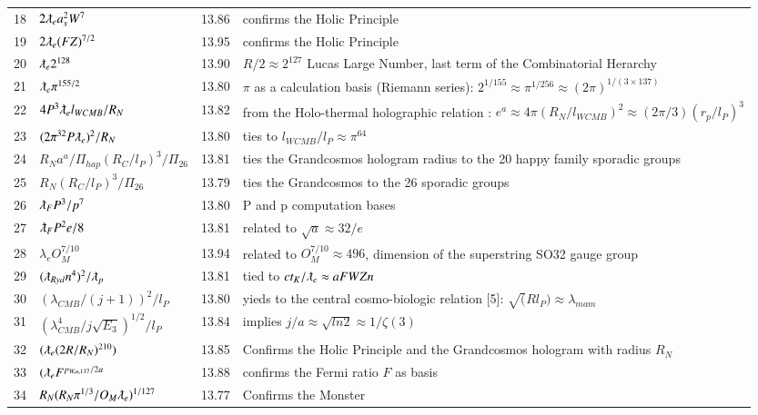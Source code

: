 \documentclass[a4paper,9pt]{article}
\begin{document}
\begin{appendix}
\begin{table}
\begin{tabular}{llll}
    18 & $2\lambdabar_{e} a_s^2 W^7$ & 13.86 & confirms the Holic Principle \\
    19 & $2\lambdabar_{e} (FZ)^{7/2}$ & 13.95 & confirms the Holic Principle \\
    20 & $\lambdabar_{e} 2^{128}$ & 13.90 & $R/2 \approx 2^{127}$ Lucas Large Number, last term of the Combinatorial Herarchy\\
    21 & $\lambdabar_{e} \pi^{155/2}$ & 13.80 & $\pi$ as a calculation basis (Riemann series): $2^{1/155} \approx \pi^{1/256} \approx (2\pi)^{1/(3\times 137)}$ \\
    22 & $4P^3\lambdabar_{e} l_{WCMB} /R_N$ & 13.82 & from the Holo-thermal holographic relation : $e^a \approx 4\pi (R_N/l_{WCMB} )^2 \approx (2\pi /3) (r_p/l_P)^3$  \\
    23 & $(2\pi^{32}P\lambdabar_{e})^2 /R_N$ & 13.80 & ties to $l_{WCMB}/l_P \approx \pi^{64}$ \\        
    24 & $R_N a^a/\Pi_{hap} (R_{C}/l_P)^3/\Pi_{26}$ & 13.81 & ties the Grandcosmos hologram radius to the 20 happy family sporadic groups \\  
    25 & $R_N (R_{C}/l_P)^3/\Pi_{26}$ & 13.79 & ties the Grandcosmos to the 26 sporadic groups \\   
    26 & $\lambdabar_{F} P^3 /p^7$ & 13.80 & P and p computation bases \\      
    27 & $\lambdabar_{F} P^2 e/8$ & 13.81 &  related to $\sqrt a  \approx 32/e$ \\     
    28 &  $\lambda_{e} O_M^{7/10}$ & 13.94 &  related to $O_M^{7/10} \approx 496$, dimension of the superstring SO32 gauge group  \\
    29 & $(\lambdabar_{Ryd} n^{4})^2/\lambdabar_p$ & 13.81 & tied to $ct_K/\lambdabar_e \approx aFWZn$ \\ 
    30 & $(\lambda_{CMB}/(j+1))^2/l_P$ & 13.80 & yieds to the central cosmo-biologic relation [5]: $\sqrt(Rl_P) \approx \lambda_{mam}$ \\
    31 & $(\lambda_{CMB}^4/j\sqrt{E_3})^{1/2}/l_P$ & 13.84 & implies $j/a \approx \sqrt{ln2} \approx 1/\zeta(3)$\\ 
    32 & $(\lambdabar_{e} (2R/R_N)^{210})$ & 13.85 & Confirms the Holic Principle and the  Grandcosmos hologram with radius $R_N$  \\
    33 & $(\lambdabar_{e} F^{p_{W, a, 137}/2a}$ & 13.88 & confirms the Fermi ratio $F$ as basis  \\
    34 & $R_N(R_N \pi^{1/3}/O_M\lambdabar_{e})^{1/127}$ & 13.77 & Confirms the Monster  \\

\end{tabular}
\end{table}
\end{appendix}
\end{document}
